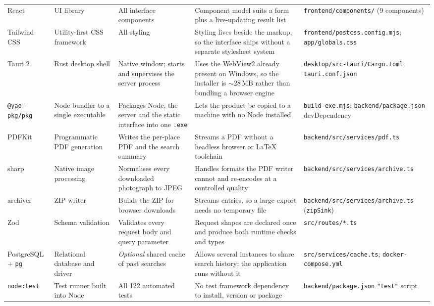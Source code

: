 \documentclass[11pt,a4paper]{report}
\newcommand{\code}[1]{\texttt{\small #1}}
\DeclareRobustCommand{\file}[1]{{\small\nolinkurl{#1}}}
\begin{document}
\begin{landscape}
\begin{longtable}{@{}>{\raggedright\arraybackslash}p{2.8cm}>{\raggedright\arraybackslash}p{3.8cm}>{\raggedright\arraybackslash}p{5.0cm}>{\raggedright\arraybackslash}p{5.2cm}>{\raggedright\arraybackslash}p{4.6cm}@{}}
React & UI library & All interface components & Component model suits a form plus
a live-updating result list & \file{frontend/components/} (9 components)\\

Tailwind CSS & Utility-first CSS framework & All styling & Styling lives beside
the markup, so the interface ships without a separate stylesheet system &
\file{frontend/postcss.config.mjs}; \file{app/globals.css}\\

Tauri 2 & Rust desktop shell & Native window; starts and supervises the server
process & Uses the WebView2 already present on Windows, so the installer is
$\sim$28\,MB rather than bundling a browser engine &
\file{desktop/src-tauri/Cargo.toml}; \file{tauri.conf.json}\\

\code{@yao-pkg/pkg} & Node bundler to a single executable & Packages Node, the
server and the static interface into one \code{.exe} & Lets the product be copied
to a machine with no Node installed & \file{build-exe.mjs};
\file{backend/package.json} devDependency\\

PDFKit & Programmatic PDF generation & Writes the per-place PDF and the search
summary & Streams a PDF without a headless browser or LaTeX toolchain &
\file{backend/src/services/pdf.ts}\\

sharp & Native image processing & Normalises every downloaded photograph to JPEG &
Handles formats the PDF writer cannot and re-encodes at a controlled quality &
\file{backend/src/services/archive.ts}\\

archiver & ZIP writer & Builds the ZIP for browser downloads & Streams entries,
so a large export needs no temporary file &
\file{backend/src/services/archive.ts} (\code{zipSink})\\

Zod & Schema validation & Validates every request body and query parameter &
Request shapes are declared once and produce both runtime checks and types &
\file{src/routes/*.ts}\\

PostgreSQL + \code{pg} & Relational database and driver & \emph{Optional} shared
cache of past searches & Allows several instances to share search history; the
application runs without it & \file{src/services/cache.ts};
\file{docker-compose.yml}\\

\code{node:test} & Test runner built into Node & All 122 automated tests & No
test framework dependency to install, version or package &
\file{backend/package.json} \code{"test"} script\\

\end{longtable}
\end{landscape}
\end{document}
